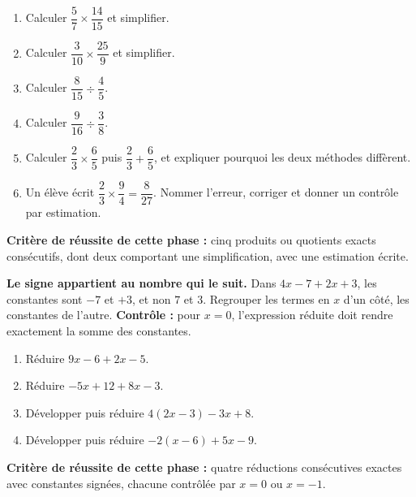 \documentclass[10pt,a4paper]{article}
\begin{document}
\begin{enumerate}
\needspace{18mm}
\item Calculer $\dfrac{5}{7}\times\dfrac{14}{15}$ et simplifier.
\needspace{18mm}
\item Calculer $\dfrac{3}{10}\times\dfrac{25}{9}$ et simplifier.
\needspace{18mm}
\item Calculer $\dfrac{8}{15}\div\dfrac{4}{5}$.
\needspace{18mm}
\item Calculer $\dfrac{9}{16}\div\dfrac{3}{8}$.
\needspace{18mm}
\item Calculer $\dfrac{2}{3}\times\dfrac{6}{5}$ puis $\dfrac{2}{3}+\dfrac{6}{5}$, et expliquer pourquoi les deux méthodes diffèrent.
\needspace{18mm}
\item Un élève écrit $\dfrac{2}{3}\times\dfrac{9}{4}=\dfrac{8}{27}$. Nommer l'erreur, corriger et donner un contrôle par estimation.
\end{enumerate}
\begin{successbox}\textbf{Critère de réussite de cette phase :} cinq produits ou quotients exacts consécutifs, dont deux comportant une simplification, avec une estimation écrite.\end{successbox}
\certline
\needspace{62mm}\par\vspace{3mm}
\begin{methodbox}
\textbf{Le signe appartient au nombre qui le suit.} Dans $4x - 7 + 2x + 3$, les constantes sont $-7$ et $+3$,
et non $7$ et $3$. Regrouper les termes en $x$ d'un côté, les constantes de l'autre.
\textbf{Contrôle :} pour $x = 0$, l'expression réduite doit rendre exactement la somme des constantes.
\end{methodbox}
\begin{enumerate}
\needspace{18mm}
\item Réduire $9x - 6 + 2x - 5$.
\needspace{18mm}
\item Réduire $-5x + 12 + 8x - 3$.
\needspace{18mm}
\item Développer puis réduire $4(2x - 3) - 3x + 8$.
\needspace{18mm}
\item Développer puis réduire $-2(x - 6) + 5x - 9$.
\end{enumerate}
\begin{successbox}\textbf{Critère de réussite de cette phase :} quatre réductions consécutives exactes avec constantes signées, chacune contrôlée par $x = 0$ ou $x = -1$.\end{successbox}
\certline
\needspace{62mm}\par\vspace{3mm}
\end{document}
